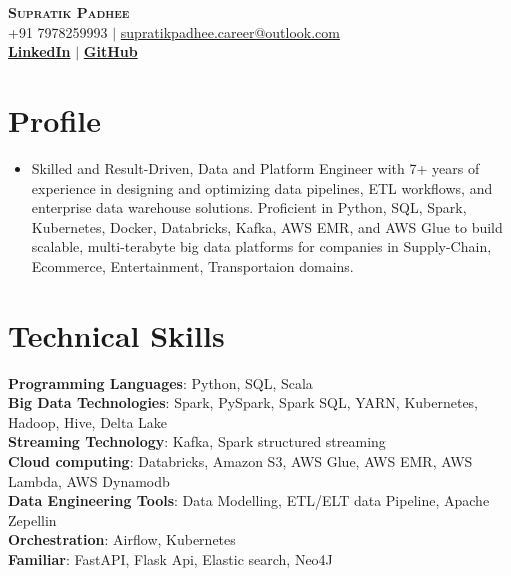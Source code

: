 \documentclass[letterpaper,11pt]{article}
\begin{document}
\begin{center}
    \textbf{\Huge \scshape Supratik Padhee} \\ \vspace{0pt}
    \medium +91 7978259993 $|$ \href{https://outlook.live.com}{supratikpadhee.career@outlook.com}    \\ 
    \medium  
    \href{https://linkedin.com/in/supratikpadhee}{\bf LinkedIn} $|$
    \href{https://github.com/piCOOLpa}{\bf GitHub} 
\end{center}

\vspace{-30pt}
\section{Profile}
\begin{itemize}[leftmargin=0.15in, label={}]
\item 
Skilled and Result-Driven, Data and Platform Engineer with 7+ years of experience in designing and optimizing data pipelines, ETL workflows, and enterprise data warehouse solutions. Proficient in Python, SQL, Spark, Kubernetes, Docker, Databricks, Kafka, AWS EMR, and AWS Glue to build scalable, multi-terabyte big data platforms for companies in Supply-Chain, Ecommerce, Entertainment, Transportaion domains.
\end{itemize}

\section{Technical Skills}
 \begin{itemize}[leftmargin=0.15in, label={}]
    \small{\item{
     \textbf{Programming Languages}{:\hspace{0.06cm}  Python, SQL, Scala} \\
     \textbf{Big Data Technologies}{:\hspace{0.49cm}     Spark, PySpark, Spark SQL, YARN, Kubernetes, Hadoop, Hive, Delta Lake } \\
     \textbf{Streaming Technology}{:\hspace{0.51cm} Kafka, Spark structured streaming} \\
     \textbf{Cloud computing}{:\hspace{1.38cm} Databricks, Amazon S3, AWS Glue, AWS EMR, AWS Lambda, AWS Dynamodb } \\
     \textbf{Data Engineering Tools}{:\hspace{0.28cm} Data Modelling, ETL/ELT data Pipeline, Apache Zepellin}\\
     \textbf{Orchestration}{:\hspace{2.02cm} Airflow, Kubernetes} \\
     \textbf{Familiar}{:\hspace{3cm} FastAPI, Flask Api, Elastic search, Neo4J} \\
    }}
 \end{itemize}
\end{document}
